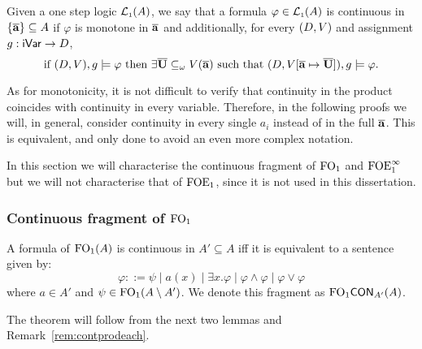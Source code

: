 
Given a one step logic $\mathcal{L}_{\scriptscriptstyle 1}(A)$, we say that a formula $\varphi \in \mathcal{L}_{\scriptscriptstyle 1}(A)$ is continuous in $\{\overline{{\mathbf{a}}}\} \subseteq A$ if $\varphi$ is monotone in $\overline{{\mathbf{a}}}$ and additionally, for every $(D,V)$ and assignment $g:\mathsf{iVar}\to D$,
\[
\text{if } (D,\val),\ass \models \varphi \text{ then } \exists \vlist{U} \subseteq_\omega \val(\vlist{a}) \text{ such that } (D, \val[\vlist{a} \mapsto \vlist{U}]),\ass \models \varphi.
\]

\begin{remark}\label{rem:contprodeach}
	As for monotonicity, it is not difficult to verify that continuity in the product coincides with continuity in every variable. Therefore, in the following proofs we will, in general, consider continuity in every single $a_i$ instead of in the full $\overline{{\mathbf{a}}}$. This is equivalent, and only done to avoid an even more complex notation.
\end{remark}

In this section we will characterise the continuous fragment of $\mathrm{FO}_1$ and $\mathrm{FOE}^{\infty}_1$ but we will not characterise that of $\mathrm{FOE}_1$, since it is not used in this dissertation.

\subsubsection{Continuous fragment of $\mathrm{FO}_1$}

\begin{theorem}\label{thm:ofocont}
A formula of $\mathrm{FO}_1(A)$ is continuous in $A' \subseteq A$ iff it is equivalent to a sentence given by:
\[
\varphi ::= \psi \mid a(x) \mid \exists x.\varphi \mid \varphi \land \varphi \mid \varphi \lor \varphi
\]
where $a\in A'$ and $\psi \in \mathrm{FO}_1(A\setminus A')$. We denote this fragment as $\mathrm{FO}_1\mathsf{CON}_{A'}(A)$.
\end{theorem}
%
The theorem will follow from the next two lemmas and Remark~\ref{rem:contprodeach}.

